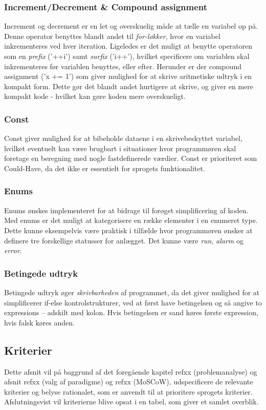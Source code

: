 \subsubsection{Increment/Decrement \& Compound assignment} 
Increment og decrement er en let og overskuelig måde at tælle en variabel op på.
Denne operator benyttes blandt andet til \textit{for-løkker}, hvor en variabel inkrementeres ved hver iteration.
Ligeledes er det muligt at benytte operatoren som en \textit{prefix} ('++i') samt \textit{surfix} ('i++'), hvilket specificere om variablen skal inkrementeres før variablen benyttes, eller efter.
Herunder er der compound assignment ('x += 1') som giver mulighed for at skrive aritmetiske udtryk i en kompakt form. Dette gør det blandt andet hurtigere at skrive, og giver en mere kompakt kode - hvilket kan gøre koden mere overskueligt.

\subsubsection{Const}
Const giver mulighed for at bibeholde dataene i en skrivebeskyttet variabel, hvilket eventuelt kan være brugbart i situationer hvor programmøren skal foretage en beregning med nogle fastdefinerede værdier. Const er prioriteret som Could-Have, da det ikke er essentielt for sprogets funktionalitet. 

\subsubsection{Enums} 
Enums ønskes implementeret for at bidrage til forøget simplificering af koden. Med enums er det muligt at kategorisere en række elementer i en enumeret type. Dette kunne eksempelvis være praktisk i tilfælde hvor programmøren ønsker at definere tre forskellige statusser for anlægget. Det kunne være \textit{run}, \textit{alarm} og \textit{error}.

\subsubsection{Betingede udtryk}
Betingede udtryk øger \textit{skrivbarheden} af programmet, da det giver mulighed for at simplificerer if-else kontrolstrukturer, ved at først have betingelsen og så angive to expressions – adskilt med kolon. Hvis betingelsen er sand køres første expression, hvis falsk køres anden. 

\subsection{Kriterier}
Dette afsnit vil på baggrund af det foregående kapitel refxx (problemanalyse) og afsnit refxx (valg af paradigme) og refxx (MoSCoW), udspecificere de relevante kriterier og belyse rationalet, som er anvendt til at prioritere sprogets kriterier. Afslutningsvist vil kriterierne blive opsat i en tabel, som giver et samlet overblik.

